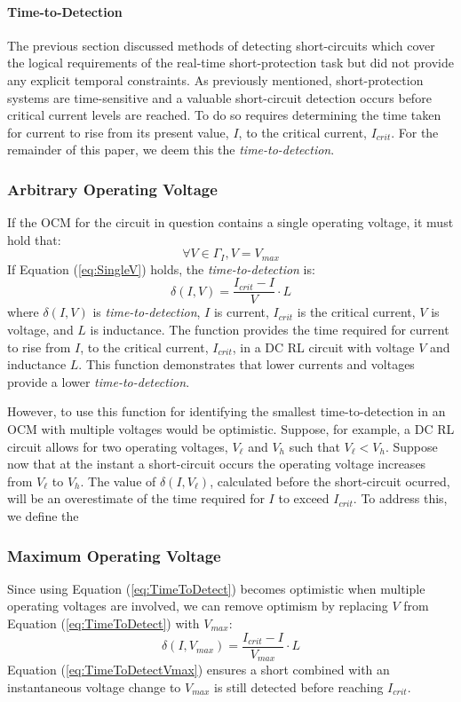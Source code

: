 \paragraph{Time-to-Detection}
The previous section discussed methods of detecting short-circuits which cover the logical requirements of the real-time short-protection task but did not provide any explicit temporal constraints. As previously mentioned, short-protection systems are time-sensitive and a valuable short-circuit detection occurs before critical current levels are reached. To do so requires determining the time taken for current to rise from its present value, $I$, to the critical current, $I_{crit}$. For the remainder of this paper, we deem this the \textit{time-to-detection}.

\subsubsection{Arbitrary Operating Voltage}
If the OCM for the circuit in question contains a single operating voltage, it must hold that:
\begin{equation}\label{eq:SingleV}
\forall  V  \in \Gamma_{I}, V = V_{max}
\end{equation}
If Equation (\ref{eq:SingleV}) holds, the \textit{time-to-detection}  is:
\begin{equation}\label{eq:TimeToDetect}
\delta(I,V) = \frac{I_{crit}-I}{V}\cdot L
\end{equation}
where $\delta(I,V)$ is \textit{time-to-detection}, $I$ is current, $I_{crit}$ is the critical current, $V$ is voltage, and $L$ is inductance. The function provides the time required for current to rise from $I$, to the critical current, $I_{crit}$, in a DC RL circuit with voltage $V$ and inductance $L$. This function demonstrates that lower currents and voltages provide a lower \textit{time-to-detection}.
    
However, to use this function for identifying the smallest time-to-detection in an OCM with multiple voltages would be optimistic. Suppose, for example, a DC RL circuit allows for two operating voltages, $V_\ell$ and $V_h$ such that $V_\ell < V_h$. Suppose now that at the instant a short-circuit occurs the operating voltage increases from $V_\ell$ to $V_h$. The value of $\delta(I,V_\ell)$, calculated before the short-circuit ocurred, will be an overestimate of the time required for $I$ to exceed $I_{crit}$. To address this, we define the 

\subsubsection{Maximum Operating Voltage}
Since using Equation (\ref{eq:TimeToDetect}) becomes optimistic when multiple operating voltages are involved, we can remove optimism by replacing $V$ from Equation (\ref{eq:TimeToDetect}) with $V_{max}$:
\begin{equation}\label{eq:TimeToDetectVmax}
\delta(I,V_{max}) = \frac{I_{crit}-I}{V_{max}}\cdot L
\end{equation}
Equation (\ref{eq:TimeToDetectVmax}) ensures a short combined with an instantaneous voltage change to $V_{max}$ is still detected before reaching $I_{crit}$.

